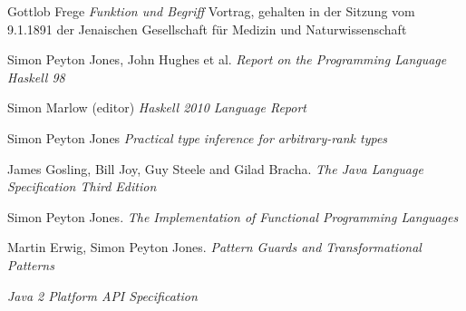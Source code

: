 \documentclass[a4paper,landscape,twocolumn]{report}
\begin{document}
%



\begin{thebibliography}{99}

 Gottlob Frege \emph{Funktion und Begriff} 
\small{Vortrag, gehalten in der Sitzung vom 9.1.1891 der Jenaischen Gesellschaft für Medizin und Naturwissenschaft}

 Simon Peyton Jones,
John Hughes et al. \emph{Report on the Programming Language
Haskell 98}

 Simon Marlow (editor) \emph{Haskell 2010 Language Report}

 Simon Peyton Jones \emph{Practical type
inference for arbitrary-rank types}

 James Gosling, Bill Joy, Guy Steele and
Gilad Bracha. \emph{The Java Language Specification Third
Edition}

 Simon Peyton Jones. \emph{The Implementation of
Functional Programming Languages}

 Martin Erwig, Simon Peyton Jones. \emph{Pattern
Guards and Transformational Patterns}

 \emph{Java 2 Platform API Specification}

\end{thebibliography}


\printindex

\end{document}
